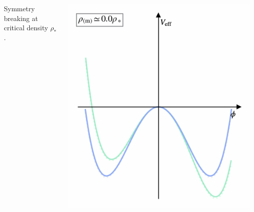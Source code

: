 \begin{frame}[plain]
\begin{columns}
\begin{column}{0.5\textwidth}
        \medskip
        \textcolor{paletaupe}{Symmetry breaking at critical density $\rho_\ast$.}
    \end{column}
    \begin{column}{0.5\textwidth}\small
        \centering
        \vspace*{-3mm}
        \ifCompAnims
        \else
            \includegraphics[keepaspectratio,width=\columnwidth,height=0.98\textheight]{gifs/asym/asym-99}
        \fi
    \end{column}
    \end{columns}




\end{frame}
